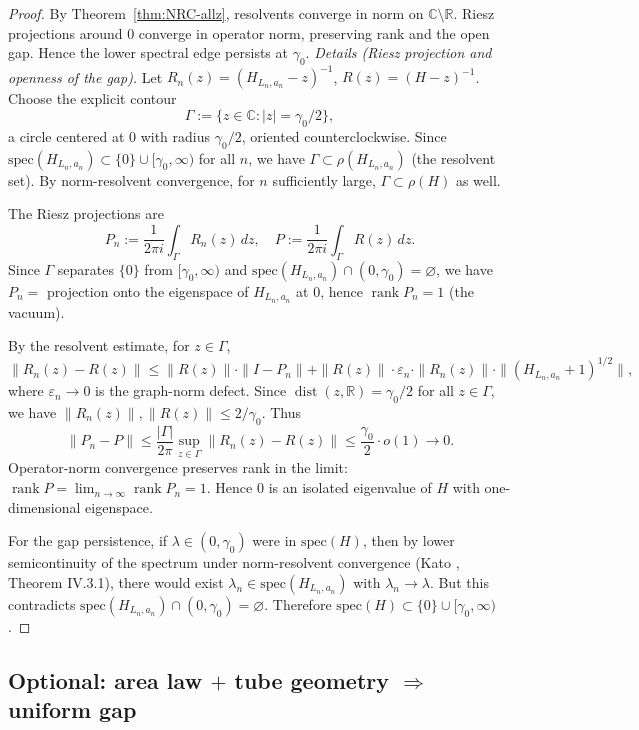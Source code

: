 \documentclass[11pt]{amsart}
\begin{document}
\begin{proof}
By Theorem~\ref{thm:NRC-allz}, resolvents converge in norm on $\mathbb C\setminus\mathbb R$. Riesz projections around $0$ converge in operator norm, preserving rank and the open gap. Hence the lower spectral edge persists at $\gamma_0$.
\smallskip
\noindent\emph{Details (Riesz projection and openness of the gap).} Let $R_n(z)=(H_{L_n,a_n}-z)^{-1}$, $R(z)=(H-z)^{-1}$. Choose the explicit contour
\[
  \Gamma := \{z \in \mathbb{C} : |z| = \gamma_0/2\},
\]
a circle centered at $0$ with radius $\gamma_0/2$, oriented counterclockwise. Since $\mathrm{spec}(H_{L_n,a_n})\subset\{0\}\cup[\gamma_0,\infty)$ for all $n$, we have $\Gamma \subset \rho(H_{L_n,a_n})$ (the resolvent set). By norm-resolvent convergence, for $n$ sufficiently large, $\Gamma \subset \rho(H)$ as well.

The Riesz projections are
\[
  P_n := \frac{1}{2\pi i}\int_\Gamma R_n(z)\,dz, \quad P := \frac{1}{2\pi i}\int_\Gamma R(z)\,dz.
\]
Since $\Gamma$ separates $\{0\}$ from $[\gamma_0,\infty)$ and $\mathrm{spec}(H_{L_n,a_n})\cap(0,\gamma_0)=\varnothing$, we have $P_n = $ projection onto the eigenspace of $H_{L_n,a_n}$ at $0$, hence $\operatorname{rank} P_n = 1$ (the vacuum).

By the resolvent estimate, for $z \in \Gamma$,
\[
  \|R_n(z) - R(z)\| \le \|R(z)\| \cdot \|I - P_n\| + \|R(z)\| \cdot \varepsilon_n \cdot \|R_n(z)\| \cdot \|(H_{L_n,a_n}+1)^{1/2}\|,
\]
where $\varepsilon_n \to 0$ is the graph-norm defect. Since $\operatorname{dist}(z,\mathbb{R}) = \gamma_0/2$ for all $z \in \Gamma$, we have $\|R_n(z)\|, \|R(z)\| \le 2/\gamma_0$. Thus
\[
  \|P_n - P\| \le \frac{|\Gamma|}{2\pi} \sup_{z \in \Gamma} \|R_n(z) - R(z)\| \le \frac{\gamma_0}{2} \cdot o(1) \to 0.
\]
Operator-norm convergence preserves rank in the limit: $\operatorname{rank} P = \lim_{n\to\infty} \operatorname{rank} P_n = 1$. Hence $0$ is an isolated eigenvalue of $H$ with one-dimensional eigenspace.

For the gap persistence, if $\lambda \in (0,\gamma_0)$ were in $\mathrm{spec}(H)$, then by lower semicontinuity of the spectrum under norm-resolvent convergence (Kato \cite{Kato1995}, Theorem IV.3.1), there would exist $\lambda_n \in \mathrm{spec}(H_{L_n,a_n})$ with $\lambda_n \to \lambda$. But this contradicts $\mathrm{spec}(H_{L_n,a_n}) \cap (0,\gamma_0) = \varnothing$. Therefore $\mathrm{spec}(H) \subset \{0\} \cup [\gamma_0,\infty)$.
\end{proof}

\subsection*{Optional: area law $+$ tube geometry $\Rightarrow$ uniform gap}
\end{document}

